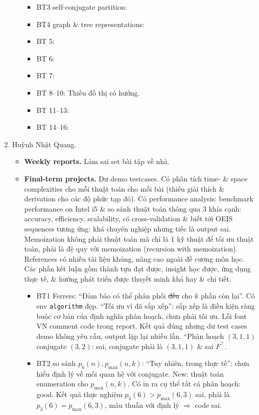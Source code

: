 \documentclass{article}
\begin{document}
\begin{enumerate}
\begin{itemize}
\begin{itemize}
            \item BT3 self-conjugate partition:
            \item BT4 graph \& tree representations:
            \item BT 5:
            \item BT 6:
            \item BT 7:
            \item BT 8--10: Thiếu đồ thị có hướng.
            \item BT 11--13:
            \item BT 14--16:
        \end{itemize}
    \end{itemize}
    \item {\sc Huỳnh Nhật Quang.}
    \begin{itemize}
        \item {\bf Weekly reports.} Làm sai set bài tập về nhà.
        \item {\bf Final-term projects.} Dư demo testcases. Có phân tích time- \& space complexities cho mỗi thuật toán cho mỗi bài (thiếu giải thích \& derivation cho các độ phức tạp đó). Có performance analysis: benchmark performance on Intel i5 \& so sánh thuật toán thông qua 3 khía cạnh: accuracy, efficiency, scalability, có cross-validation \& biết tới OEIS sequences tương ứng: khá chuyên nghiệp nhưng tiếc là output sai. Memoization không phải thuật toán mà chỉ là 1 kỹ thuật để tối ưu thuật toán, phải là đệ quy với memoization (recursion with memoization). References có nhiều tài liệu khủng, nâng cao ngoài đề cương môn học. Các phần kết luận gồm thành tựu đạt được, insight học được, ứng dụng thực tế, \& hướng phát triển được thuyết minh khá hay \& chi tiết.
        \begin{itemize}
            \item BT1 Ferrers: ``Đảm bảo có thể phân phối \st{đều} cho $k$ phần còn lại''. Có env {\tt algorithm} đẹp. ``Tối ưu vì đã sắp xếp'': sắp xếp là điều kiện ràng buộc cơ bản của định nghĩa phân hoạch, chưa phải tối ưu. Lỗi font VN comment code trong report. Kết quả đúng nhưng dư test cases demo không yêu cầu, output lặp lại nhiều lần. ``Phân hoạch $(3,1,1)$ conjugate $(3,2)$: sai, conjugate phải là $(3,1,1)$ \& sai $F^\top$.
            \item BT2 so sánh $p_k(n),p_{\max}(n,k)$: ``Tuy nhiên, trong thực tế'': chưa hiểu định lý về mối quan hệ với conjugate. New: thuật toán enumeration cho $p_{\max}(n,k)$. Có in ra cụ thể tất cả phân hoạch: good. Kết quả thực nghiệm $p_3(6) > p_{\max}(6,3)$ sai, phải là $p_3(6) = p_{\max}(6,3)$, mâu thuẫn với định lý $\Rightarrow$ code sai.

\end{itemize}
\end{itemize}
\end{enumerate}
\end{document}
